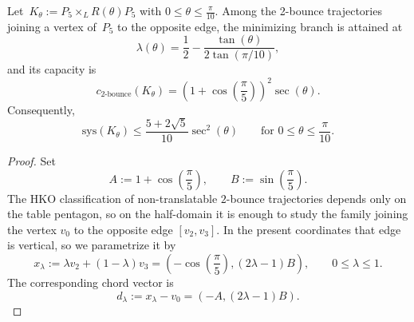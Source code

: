 \begin{unverified}
\begin{proposition}
\label{prop:pentagon-rotation-two-bounce}
Let~$K_\theta := P_5 \times_L R(\theta)P_5$ with
$0 \le \theta \le \frac{\pi}{10}$. Among the 2-bounce trajectories joining a
vertex of~$P_5$ to the opposite edge, the minimizing branch is attained at
\[
  \lambda(\theta)
  =
  \frac{1}{2}
  -
  \frac{\tan(\theta)}{2\tan(\pi/10)},
\]
and its capacity is
\[
  c_{2\text{-bounce}}(K_\theta)
  =
  \left(1+\cos\left(\frac{\pi}{5}\right)\right)^2 \sec(\theta).
\]
Consequently,
\[
  \mathrm{sys}(K_\theta)
  \le
  \frac{5 + 2\sqrt{5}}{10}\sec^2(\theta)
  \qquad
  \text{for } 0 \le \theta \le \frac{\pi}{10}.
\]
\end{proposition}


\begin{proof}
Set
\[
  A := 1 + \cos\left(\frac{\pi}{5}\right),
  \qquad
  B := \sin\left(\frac{\pi}{5}\right).
\]
The HKO classification of non-translatable $2$-bounce trajectories depends only
on the table pentagon, so on the half-domain it is enough to study the family
joining the vertex $v_0$ to the opposite edge $[v_2,v_3]$. In the present
coordinates that edge is vertical, so we parametrize it by
\[
  x_\lambda := \lambda v_2 + (1-\lambda)v_3
  =
  \left(
    -\cos\left(\frac{\pi}{5}\right),
    (2\lambda-1)B
  \right),
  \qquad 0 \le \lambda \le 1.
\]
The corresponding chord vector is
\[
  d_\lambda := x_\lambda - v_0 = (-A,(2\lambda-1)B).
\]


\end{proof}
\end{unverified}
